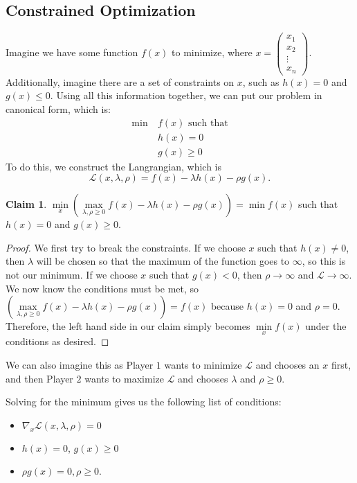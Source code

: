 \documentclass[12pt]{article}
\theoremstyle{plain} %
\theoremstyle{definition}
\newtheorem*{claim}{Claim}
\theoremstyle{definition}
\theoremstyle{definition}
\theoremstyle{remark}
\newcommand{\Lagr}{\mathcal{L}}
\begin{document}
\subsection{Constrained Optimization}
Imagine we have some function $f(x)$ to minimize,
where $x = \begin{pmatrix} x_1 \\ x_2 \\ \vdots \\ x_n \end{pmatrix}.$ Additionally, imagine there are a set of constraints on $x$, such as $h(x) = 0$ and $g(x) \leq 0$. Using all this information together, we can put our problem in canonical form, which is:
\begin{align*}
    \min \  &f(x) \text{ such that} \\
    &h(x) = 0 \\
    &g(x) \geq 0
\end{align*}
To do this, we construct the Langrangian, which is
\[ \Lagr \left(x,\lambda,\rho \right) = f(x) - \lambda h(x) -\rho g(x). \]
\begin{claim}
    $\min\limits_x\left(\max\limits_{\lambda,\rho\geq0}  f(x) - \lambda h(x) -\rho g(x)\right) = \min f(x)$ such that $h(x) = 0 $ and $g(x) \geq 0$.
\end{claim}
\begin{proof}
We first try to break the constraints. If we choose $x$ such that $h(x) \neq 0$, then $\lambda$ will be chosen so that the maximum of the function goes to $\infty$, so this is not our minimum. If we choose $x$ such that $g(x) < 0$, then $\rho \to \infty$ and $\Lagr \to \infty$. We now know the conditions must be met, so $\left(\max\limits_{\lambda,\rho\geq0}  f(x) - \lambda h(x) -\rho g(x)\right) = f(x)$ because $h(x) = 0$ and $\rho = 0$. Therefore, the left hand side in our claim simply becomes $\min\limits_x f(x)$ under the conditions as desired.
\end{proof}
We can also imagine this as Player $1$ wants to minimize $\Lagr$ and chooses an $x$ first, and then Player $2$ wants to maximize $\Lagr$ and chooses $\lambda$ and $\rho \geq 0$.

Solving for the minimum gives us the following list of conditions:
\begin{itemize}
    \item $\nabla_x \Lagr(x,\lambda,\rho) = 0$
    \item $h(x) = 0$, $g(x) \geq 0$ %
    \item $\rho g(x) = 0, \rho \geq 0$.
\end{itemize}
\end{document}
